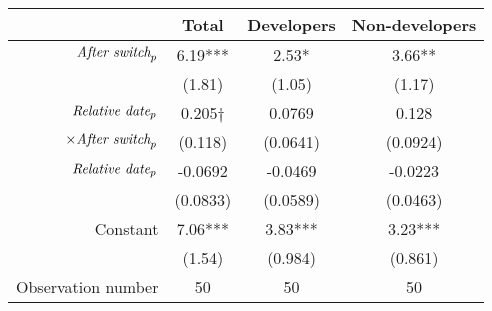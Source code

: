 \begin{tabular}{|r|c|c|c|}
\hline
&  Total & Developers & Non-developers \\
\hline
$\mbox{\emph{After switch}}_p$ & 6.19*** & 2.53* & 3.66** \\
 & (1.81) & (1.05) & (1.17) \\
\hline
$\mbox{\emph{Relative date}}_p$ & 0.205$\dagger$ & 0.0769 & 0.128 \\
$\times \mbox{\emph{After switch}}_p$ & (0.118) & (0.0641) & (0.0924) \\
\hline
$\mbox{\emph{Relative date}}_p$ & -0.0692 & -0.0469 & -0.0223 \\
 & (0.0833) & (0.0589) & (0.0463) \\
\hline
Constant & 7.06*** & 3.83*** & 3.23*** \\
 & (1.54) & (0.984) & (0.861) \\
\hline
Observation number & 50 & 50 & 50 \\
\hline
\end{tabular}